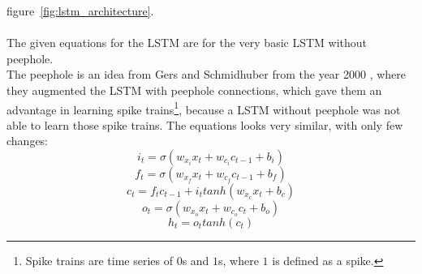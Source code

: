   figure~\ref{fig:lstm_architecture}.\\\\
  The given equations for the LSTM are for the very basic LSTM without peephole.\\
  The peephole is an idea from Gers and Schmidhuber from the year 2000 \cite{Gers2000}, where they augmented the LSTM
  with peephole connections, which gave them an advantage in learning spike trains\footnote[1]{Spike trains are time series of $0$s and $1$s, where $1$ is 
  defined as a spike.}, because a LSTM without peephole was not able to learn those spike trains.
  The equations looks very similar, with only few changes:
  \begin{equation}
   i_t = \sigma(w_{x_i}x_t + w_{c_i}c_{t-1} + b_i)
  \end{equation}
  \begin{equation}
   f_t = \sigma(w_{x_f}x_t + w_{c_f}c_{t-1} + b_f)
  \end{equation}
  \begin{equation}
   c_t = f_tc_{t-1} + i_ttanh(w_{x_c}x_t + b_c)
  \end{equation}
  \begin{equation}
   o_t = \sigma(w_{x_o}x_t + w_{c_o}c_t + b_o)
  \end{equation}
  \begin{equation}
   h_t = o_ttanh(c_t)
  \end{equation}
  
